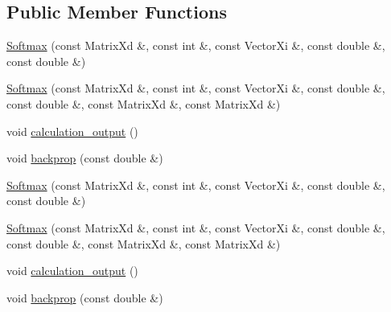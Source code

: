 \subsection*{\-Public \-Member \-Functions}
\begin{DoxyCompactItemize}
\item 
\hyperlink{classlibcnn_1_1_softmax_a1905addb7d4894b92ebb3c141040f7a1}{\-Softmax} (const \-Matrix\-Xd \&, const int \&, const \-Vector\-Xi \&, const double \&, const double \&)
\item 
\hyperlink{classlibcnn_1_1_softmax_aa43e90709ba3c5e44e5b7b435e54a902}{\-Softmax} (const \-Matrix\-Xd \&, const int \&, const \-Vector\-Xi \&, const double \&, const double \&, const \-Matrix\-Xd \&, const \-Matrix\-Xd \&)
\item 
void \hyperlink{classlibcnn_1_1_softmax_ae6af9e18ce2ab849d26b38a9d4a5be20}{calculation\-\_\-output} ()
\item 
void \hyperlink{classlibcnn_1_1_softmax_ad52de893453032d29c6fb3bca6e9f492}{backprop} (const double \&)
\item 
\hyperlink{classlibcnn_1_1_softmax_a1905addb7d4894b92ebb3c141040f7a1}{\-Softmax} (const \-Matrix\-Xd \&, const int \&, const \-Vector\-Xi \&, const double \&, const double \&)
\item 
\hyperlink{classlibcnn_1_1_softmax_aa43e90709ba3c5e44e5b7b435e54a902}{\-Softmax} (const \-Matrix\-Xd \&, const int \&, const \-Vector\-Xi \&, const double \&, const double \&, const \-Matrix\-Xd \&, const \-Matrix\-Xd \&)
\item 
void \hyperlink{classlibcnn_1_1_softmax_ae6af9e18ce2ab849d26b38a9d4a5be20}{calculation\-\_\-output} ()
\item 
void \hyperlink{classlibcnn_1_1_softmax_ad52de893453032d29c6fb3bca6e9f492}{backprop} (const double \&)
\end{DoxyCompactItemize}

